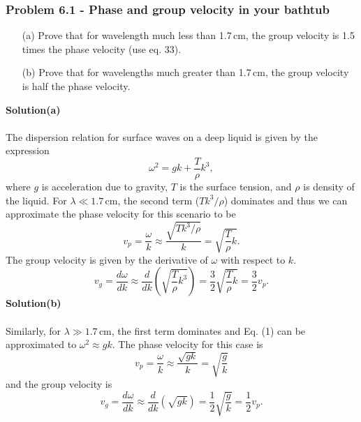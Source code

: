 \documentclass[12pt,a4paper]{article}
\begin{document}
\subsubsection*{Problem 6.1 - Phase and group velocity in your bathtub}
\begin{enumerate}
    \item[(a)]Prove that for wavelength much less than 1.7\,cm, the group velocity is 1.5 times the phase velocity (use eq. 33).
    \item[(b)]Prove that for wavelengths much greater than 1.7\,cm, the group velocity is half the phase velocity.
\end{enumerate}
\textbf{Solution(a)}
\\
\\The dispersion relation for surface waves on a deep liquid is given by the expression
\begin{equation}
    \omega^2=gk+\frac{T}{\rho}k^3,
\end{equation}
where $g$ is acceleration due to gravity, $T$ is the surface tension, and $\rho$ is density of the liquid. For $\lambda\ll1.7\,$cm, the second term ($Tk^3/\rho$) dominates and thus we can approximate the phase velocity for this scenario to be
\[v_p=\frac{\omega}{k}\approx\frac{\sqrt{Tk^3/\rho}}{k}=\sqrt{\frac{T}{\rho}k}.\]
The group velocity is given by the derivative of $\omega$ with respect to $k$.
\[v_g=\frac{d\omega}{d k}\approx\frac{d}{d k}\left(\sqrt{\frac{T}{\rho}k^3}\right)=\frac{3}{2}\sqrt{\frac{T}{\rho}k}=\frac{3}{2}v_p.\]
\textbf{Solution(b)}
\\
\\Similarly, for $\lambda\gg1.7\,$cm, the first term dominates and Eq. (1) can be approximated to $\omega^2\approx gk$. The phase velocity for this case is
\[v_p=\frac{\omega}{k}\approx\frac{\sqrt{gk}}{k}=\sqrt{\frac{g}{k}}\]
and the group velocity is
\[v_g=\frac{d\omega}{d k}\approx\frac{d}{d k}\left(\sqrt{gk}\right)=\frac{1}{2}\sqrt{\frac{g}{k}}=\frac{1}{2}v_p.\]
\end{document}
